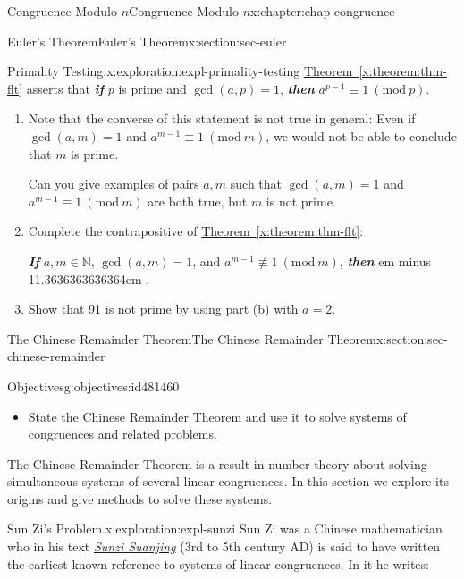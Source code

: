 \documentclass[oneside,10pt,]{book}
\newcommand{\xreffont}{\relax}
\newcommand{\alert}[1]{\textbf{\textit{#1}}}
\newcommand{\pubtitle}[1]{\textsl{#1}}
\newcommand{\fillin}[1]{\leavevmode\leaders\vrule height -1.2pt depth 1.5pt \hskip #1em minus #1em \null}
\numberwithin{equation}{section}
\newcommand{\Mod}[1]{\ \left(\mathrm{mod}\ #1\right)}
\begin{document}
\begin{chapterptx}{Congruence Modulo \(n\)}{}{Congruence Modulo \(n\)}{}{}{x:chapter:chap-congruence}
\begin{sectionptx}{Euler's Theorem}{}{Euler's Theorem}{}{}{x:section:sec-euler}
\begin{exploration}{Primality Testing.}{x:exploration:expl-primality-testing}
\hyperref[x:theorem:thm-flt]{Theorem~{\xreffont\ref{x:theorem:thm-flt}}} asserts that \alert{if} \(p\) is prime and \(\gcd(a,p)=1\), \alert{then} \(a^{p-1} \equiv 1 \Mod{p}\).%
\begin{enumerate}[font=\bfseries,label=(\alph*),ref=\alph*]
\item{}Note that the converse of this statement is not true in general: Even if \(\gcd(a,m) = 1\) and \(a^{m-1} \equiv 1 \Mod{m}\), we would not be able to conclude that \(m\) is prime.%
\par
Can you give examples of pairs \(a, m\) such that \(\gcd(a,m) = 1\) and \(a^{m-1} \equiv 1 \Mod{m}\) are both true, but \(m\) is not prime.%
\item{}Complete the contrapositive of \hyperref[x:theorem:thm-flt]{Theorem~{\xreffont\ref{x:theorem:thm-flt}}}:%
\begin{sidebyside}{1}{0.1}{0.1}{0}%
\begin{sbspanel}{0.8}%
\alert{If} \(a,m \in \mathbb{N}\), \(\gcd(a,m) = 1\), and \(a^{m-1} \not\equiv 1 \Mod{m}\), \alert{then} \fillin{11.3636363636364}.%
\end{sbspanel}%
\end{sidebyside}%
\item{}Show that 91 is not prime by using part (b) with \(a = 2\).%
\end{enumerate}
\end{exploration}
\end{sectionptx}
%
%
\typeout{************************************************}
\typeout{************************************************}
%
\begin{sectionptx}{The Chinese Remainder Theorem}{}{The Chinese Remainder Theorem}{}{}{x:section:sec-chinese-remainder}
\begin{objectives}{Objectives}{g:objectives:id481460}
%
\begin{itemize}[label=\textbullet]
\item{}State the Chinese Remainder Theorem and use it to solve systems of congruences and related problems.%
\end{itemize}
\end{objectives}
The Chinese Remainder Theorem is a result in number theory about solving simultaneous systems of several linear congruences. In this section we explore its origins and give methods to solve these systems.%
\begin{exploration}{Sun Zi's Problem.}{x:exploration:expl-sunzi}%
Sun Zi was a Chinese mathematician who in his text \href{https://en.wikipedia.org/wiki/Sunzi_Suanjing}{\pubtitle{Sunzi Suanjing}} (3rd to 5th century AD) is said to have written the earliest known reference to systems of linear congruences. In it he writes:%

\end{exploration}
\end{sectionptx}
\end{chapterptx}
\end{document}
